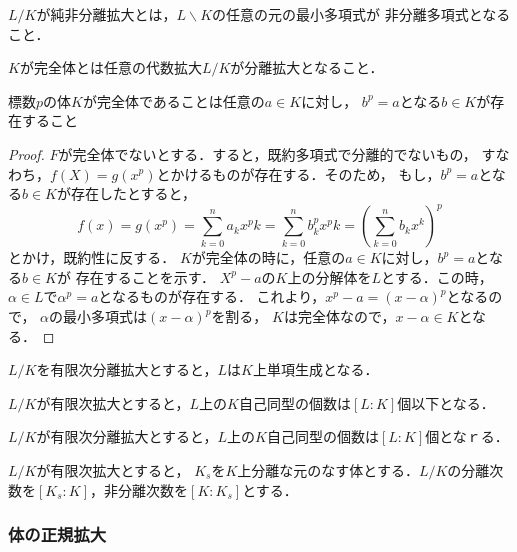 \documentclass{ujarticle}
\begin{document}
\begin{dfn}
 $L/K$が純非分離拡大とは，$L\backslash K$の任意の元の最小多項式が
 非分離多項式となること．
\end{dfn}

\begin{dfn}
 $K$が完全体とは任意の代数拡大$L/K$が分離拡大となること．
\end{dfn}

\begin{prop}
 標数$p$の体$K$が完全体であることは任意の$a \in K$に対し，
 $b^p=a$となる$b \in K$が存在すること
\end{prop}
\begin{proof}
  $F$が完全体でないとする．すると，既約多項式で分離的でないもの，
  すなわち，$f(X)=g(x^p)$とかけるものが存在する．そのため，
  もし，$b^p=a$となる$b \in K$が存在したとすると，
  \begin{equation*}
   f(x)=g(x^p)=\sum_{k=0}^na_kx^pk=
  　\sum_{k=0}^nb_k^px^pk=(\sum_{k=0}^nb_kx^k)^p
  \end{equation*}
  とかけ，既約性に反する．
  $K$が完全体の時に，任意の$a \in K$に対し，$b^p=a$となる$b \in K$が
  存在することを示す．
  $X^p-a$の$K$上の分解体を$L$とする．この時，
  $\alpha \in L$で$\alpha^p=a$となるものが存在する．
  これより，$x^p-a=(x-\alpha)^p$となるので，
  $\alpha$の最小多項式は$(x-\alpha)^p$を割る，
  $K$は完全体なので，$x - \alpha \in K$となる．
\end{proof}

\begin{prop}
 $L/K$を有限次分離拡大とすると，$L$は$K$上単項生成となる．
\end{prop}


\begin{prop}
 $L/K$が有限次拡大とすると，$L$上の$K$自己同型の個数は$[L:K]$個以下となる．
\end{prop}

\begin{prop}
   $L/K$が有限次分離拡大とすると，$L$上の$K$自己同型の個数は$[L:K]$個となｒる．
\end{prop}

\begin{dfn}
  $L/K$が有限次拡大とすると，
  $K_s$を$K$上分離な元のなす体とする．$L/K$の分離次数を$[K_s:K]$，非分離次数を$[K:K_s]$とする．
\end{dfn}

\subsubsection{体の正規拡大}
\label{sub:体の正規拡大}
\end{document}
